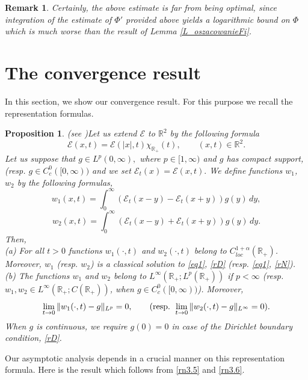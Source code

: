 \documentclass{article}
\newtheorem{proposition}{Proposition}
\newtheorem{remark}{Remark}
\def\sE{{\mathscr{E}}}
\newcommand{\bR}{\mathbb R}
\begin{document}
\begin{remark}
Certainly, the above estimate is far from being optimal, since integration of the estimate of $\Phi'$ provided above yields a logarithmic bound on $\Phi$ which is much worse than the result of Lemma \ref{L_oszacowanieFi}.
\end{remark}



\section{The convergence result} \label{s4}
In this section, we show our convergence result. 
For this purpose we recall the representation formulas.

\begin{proposition}(see \cite[Theorem 4.1]{NRS})\label{p1}
Let us extend $\sE$  to   $\bR^2$ by the following formula $$\sE(x,t) = \sE(|x|,t) \chi_{\bR_+}(t), \qquad (x,t) \in \bR^2.$$
Let us suppose that  $g\in L^p(0,\infty),$ where  $p\in[1,\infty)$ and $g$ has compact support, (resp. $g\in C^0_c([0,\infty))$
and   we set $
\sE_t(x) = \sE(x,t).$
We define functions $w_1$, $w_2$ by the  following formulas,
\begin{equation}\label{rn3.5}
w_1(x,t) = \int_0^\infty ( \sE_t(x-y) - \sE_t(x+y))g(y)\,dy,
\end{equation}
\begin{equation}\label{rn3.6}
w_2(x,t)  = \int_0^\infty ( \sE_t(x-y) + \sE_t(x+y))g(y)\,dy.
\end{equation}
Then, \\
(a) For all $t>0$ functions $w_1(\cdot,t)$ and $w_2(\cdot,t)$ belong to $C^{1+\alpha}_{loc}(\bR_+)$. Moreover, $w_1$ (resp. $w_2$) is a classical solution to \eqref{eq1}, \eqref{rD} (resp. \eqref{eq1}, \eqref{rN}).\\
(b) The functions $w_1$ and $w_2$ belong to $L^\infty(\bR_+; L^p(\bR_+))$ if $p<\infty$ (resp. $w_1, w_2 \in L^\infty(\bR_+; C(\bR_+))$, when $g\in C^0_c([0,\infty))$).
Moreover,
\begin{equation*}%
 \lim_{t\to 0}\|w_1(\cdot, t) - g\|_{L^p} =0, \qquad(\hbox{resp. }
\lim_{t\to 0}\|w_2(\cdot, t) - g\|_{L^\infty} =0).   
\end{equation*}
When $g$ is continuous, we require $g(0) =0$ in case of the Dirichlet boundary condition, \eqref{rD}.
\end{proposition}
Our asymptotic analysis depends in a crucial manner  on this representation formula. Here is the result which follows from \eqref{rn3.5}  and \eqref{rn3.6}.
\end{document}
